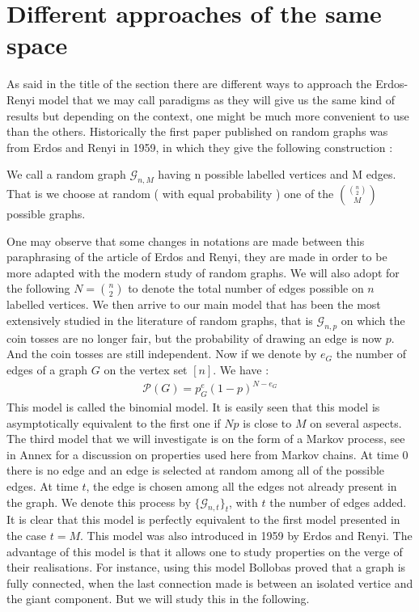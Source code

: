 \section{Different approaches of the same space}
As said in the title of the section there are different ways to approach the Erdos-Renyi model that we may call paradigms as they will give us the same kind of results but depending on the context, one might be much more convenient to use than the others.
\newline
Historically the first paper published on random graphs was from Erdos and Renyi in 1959, in which they give the following construction :
\begin{definition}
We call a random graph $\mathcal{G}_{n, M}$ having n possible labelled vertices and M edges. That is we choose at random ( with equal probability ) one of the $\binom{\binom{n}{2}}{M}$ possible graphs.
\end{definition}
One may observe that some changes in notations are made between this paraphrasing of the article of Erdos and Renyi, they are made in order to be more adapted with the modern study of random graphs. We will also adopt for the following $N = \binom{n}{2}$ to denote the total number of edges possible on $n$ labelled vertices.
\newline
We then arrive to our main model that has been the most extensively studied in the literature of random graphs, that is $\mathcal{G}_{n, p}$ on which the coin tosses are no longer fair, but the probability of drawing an edge is now $p$. And the coin tosses are still independent. Now if we denote by $e_G$ the number of edges of a graph $G$ on the vertex set $[n]$. We have :
\begin{align}
    \mathcal{P}(G) = p^e_G(1-p)^{N-e_G}
\end{align}
This model is called the binomial model. It is easily seen that this model is asymptotically equivalent to the first one if $Np$ is close to $M$ on several aspects.
\newline
The third model that we will investigate is on the form of a Markov process, see in Annex for a discussion on properties used here from Markov chains. At time 0 there is no edge and an edge is selected at random among all of the possible edges. At time $t$, the edge is chosen among all the edges not already present in the graph. We denote this process by $\{\mathcal{G}_{n, t}\}_t$, with $t$ the number of edges added. It is clear that this model is perfectly equivalent to the first model presented in the case $t = M$. This model was also introduced in 1959 by Erdos and Renyi. The advantage of this model is that it allows one to study properties on the verge of their realisations. For instance, using this model Bollobas proved that a graph is fully connected, when the last connection made is between an isolated vertice and the giant component. But we will study this in the following.




